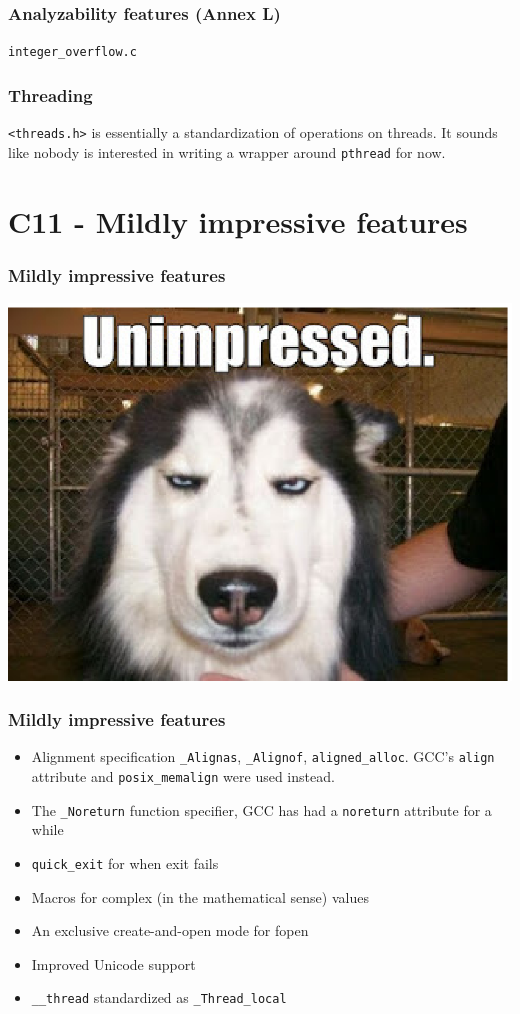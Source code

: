 \documentclass{beamer}
\begin{document}
\begin{frame}
	\frametitle{Analyzability features (Annex L)}
	\texttt{integer\_overflow.c}
\end{frame}

\begin{frame}
	\frametitle{Threading}
	\texttt{<threads.h>} is essentially a standardization of operations
	on threads. It sounds like nobody is interested in
	writing a wrapper around \texttt{pthread} for now.
\end{frame}

\section{C11 - Mildly impressive features}

\begin{frame}
	\frametitle{Mildly impressive features}
	\begin{center}
		\includegraphics[scale = 0.6]{unimpressed-dog.ps}
	\end{center}
\end{frame}

\begin{frame}
	\frametitle{Mildly impressive features}
	\begin{itemize}
		\item Alignment specification \texttt{\_Alignas}, \texttt{\_Alignof}, \texttt{aligned\_alloc}. GCC's \texttt{align} attribute and \texttt{posix\_memalign} were used instead.
		\item The \texttt{\_Noreturn} function specifier, GCC has had a \texttt{noreturn} attribute for a while
		\item \texttt{quick\_exit} for when exit fails
		\item Macros for complex (in the mathematical sense) values
		\item An exclusive create-and-open mode for fopen
		\item Improved Unicode support
		\item \texttt{\_\_thread} standardized as \texttt{\_Thread\_local}
	\end{itemize}
\end{frame}
\end{document}
